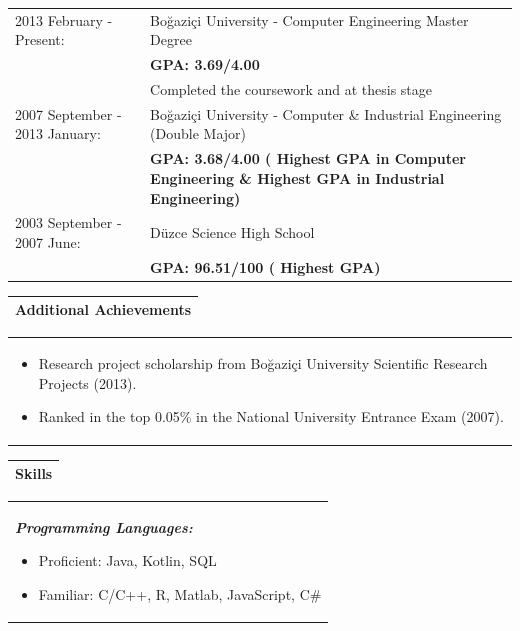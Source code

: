 \documentclass[11pt]{article}
\newcommand{\bigspace}{\vspace{0.4cm}}
\begin{document}
\begin{tabular}{p{5.5cm} p{12.5cm}}
\\
2013 February - Present:
&	Bo\u{g}azi\c{c}i University - Computer Engineering Master Degree\\
&	\textbf{GPA: 3.69/4.00}\\
&	Completed the coursework and at thesis stage\\

2007 September - 2013 January:
&	Bo\u{g}azi\c{c}i University - Computer \& Industrial Engineering (Double Major)\\
&	\textbf{GPA: 3.68/4.00 (\nth{3} Highest GPA in Computer Engineering \& \nth{4} Highest GPA in Industrial Engineering)}\\


2003 September - 2007 June:
&	D\"{u}zce Science High School\\
&	\textbf{GPA: 96.51/100 (\nth{3} Highest GPA)}
\end{tabular}

\pagebreak

\begin{tabular}{p{18cm}}
\vspace{0.5cm}
\textbf{Additional Achievements} \\
\hline
\end{tabular}

\begin{tabular}{p{18cm}}
\begin{itemize}
\setlength\itemsep{0em}
\vspace{-15pt}
\item Research project scholarship from Bo\u{g}azi\c{c}i University Scientific Research Projects (2013).
\item Ranked in the top 0.05\% in the National University Entrance Exam (2007).
\end{itemize}
\end{tabular}

\begin{tabular}{p{18cm}}
\textbf{Skills} \\
\hline
\end{tabular}

\bigspace
\begin{tabular}{p{18cm}}
\textit{\textbf{Programming Languages:}}
\vspace{-7pt}
\begin{itemize}
\setlength\itemsep{0em}
\item Proficient: Java, Kotlin, SQL
\item Familiar: C/C++, R, Matlab, JavaScript, C\#
\end{itemize}
\end{tabular}
\end{document}
